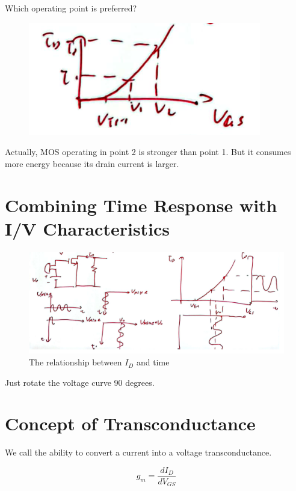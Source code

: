 \documentclass[fontset=windows]{article}
\begin{document}
Which operating point is preferred? 

\begin{figure}[htbp]
    \centering
    \includegraphics[scale=0.6]{8.jpg}
    \captionsetup{labelformat=empty}
    \caption{}
    \label{8}
\end{figure}

Actually, MOS operating in point 2 is stronger than point 1. But it consumes more energy because its drain current is larger. 

\section*{Combining Time Response with I/V Characteristics}

\begin{figure}[htbp]
    \centering
    \includegraphics[scale=0.65]{9.jpg}
    \captionsetup{labelformat=empty}
    \caption{The relationship between $I_D$ and time}
    \label{9}
\end{figure}

Just rotate the voltage curve 90 degrees.

\section*{Concept of Transconductance}

We call the ability to convert a current into a voltage transconductance. 

$$g_m=\frac{dI_D}{dV_{GS}}$$
\end{document}
